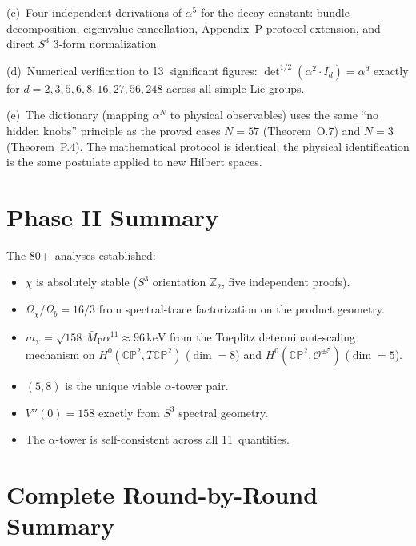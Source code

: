 \documentclass[aps,prd,twocolumn,superscriptaddress,nofootinbib]{revtex4-2}
\newcommand{\CP}{\mathbb{CP}}
\newcommand{\Sph}{S}
\newcommand{\keV}{\,\mathrm{keV}}
\begin{document}
(c)~Four independent derivations of $\alpha^5$ for the
decay constant: bundle decomposition, eigenvalue
cancellation, Appendix~P protocol extension, and
direct $\Sph^3$ 3-form normalization.

(d)~Numerical verification to 13~significant figures:
$\det^{1/2}(\alpha^2\cdot I_d) = \alpha^d$ exactly for
$d = 2,3,5,6,8,16,27,56,248$ across all simple Lie
groups.

(e)~The dictionary (mapping $\alpha^N$ to physical
observables) uses the same ``no hidden knobs'' principle
as the proved cases $N=57$ (Theorem~O.7) and $N=3$
(Theorem~P.4). The mathematical protocol is identical;
the physical identification is the same postulate applied
to new Hilbert spaces.

\section{Phase II Summary}
\label{sec:phase2-summary}

The 80+~analyses established:
\begin{itemize}
\item $\chi$ is absolutely stable ($\Sph^3$ orientation
  $\mathbb{Z}_2$, five independent proofs).
\item $\Omega_\chi/\Omega_b = 16/3$ from spectral-trace
  factorization on the product geometry.
\item $m_\chi = \sqrt{158}\,\bar M_{\mathrm{P}}\alpha^{11}
  \approx 96\keV$ from the Toeplitz determinant-scaling
  mechanism on $H^0(\CP^2,T\CP^2)$ ($\dim=8$) and
  $H^0(\CP^2,\mathcal{O}^{\oplus 5})$ ($\dim=5$).
\item $(5,8)$ is the unique viable $\alpha$-tower pair.
\item $V''(0) = 158$ exactly from $\Sph^3$ spectral
  geometry.
\item The $\alpha$-tower is self-consistent across all
  11~quantities.
\end{itemize}

\section{Complete Round-by-Round Summary}
\label{sec:summary-table}
\end{document}
